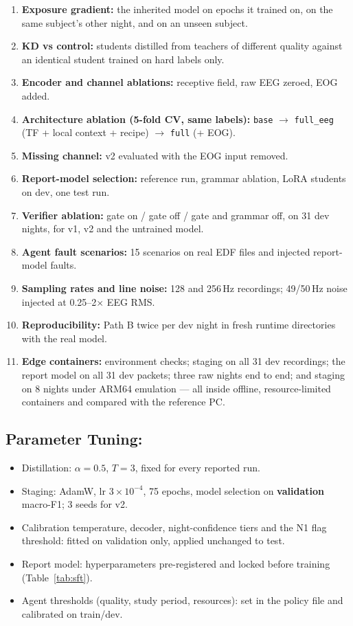 \begin{enumerate}
  \item \textbf{Exposure gradient:} the inherited model on epochs it trained on, on the same subject's other night,
  and on an unseen subject.
  \item \textbf{KD vs control:} students distilled from teachers of different quality against an identical student
  trained on hard labels only.
  \item \textbf{Encoder and channel ablations:} receptive field, raw EEG zeroed, EOG added.
  \item \textbf{Architecture ablation (5-fold CV, same labels):} \texttt{base} $\rightarrow$ \texttt{full\_eeg} (TF +
  local context + recipe) $\rightarrow$ \texttt{full} (+ EOG).
  \item \textbf{Missing channel:} v2 evaluated with the EOG input removed.
  \item \textbf{Report-model selection:} reference run, grammar ablation, LoRA students on dev, one test run.
  \item \textbf{Verifier ablation:} gate on / gate off / gate and grammar off, on 31 dev nights, for v1, v2 and the
  untrained model.
  \item \textbf{Agent fault scenarios:} 15 scenarios on real EDF files and injected report-model faults.
  \item \textbf{Sampling rates and line noise:} 128 and 256\,Hz recordings; 49/50\,Hz noise injected at 0.25--2$\times$
  EEG RMS.
  \item \textbf{Reproducibility:} Path B twice per dev night in fresh runtime directories with the real model.
  \item \textbf{Edge containers:} environment checks; staging on all 31 dev recordings; the report model on all 31
  dev packets; three raw nights end to end; and staging on 8 nights under ARM64 emulation --- all inside offline,
  resource-limited containers and compared with the reference PC.
\end{enumerate}

\subsection{Parameter Tuning:}

\begin{itemize}
  \item Distillation: $\alpha = 0.5$, $T = 3$, fixed for every reported run.
  \item Staging: AdamW, lr $3\times10^{-4}$, 75 epochs, model selection on \textbf{validation} macro-F1; 3 seeds for v2.
  \item Calibration temperature, decoder, night-confidence tiers and the N1 flag threshold: fitted on validation
  only, applied unchanged to test.
  \item Report model: hyperparameters pre-registered and locked before training (Table~\ref{tab:sft}).
  \item Agent thresholds (quality, study period, resources): set in the policy file and calibrated on train/dev.
\end{itemize}

